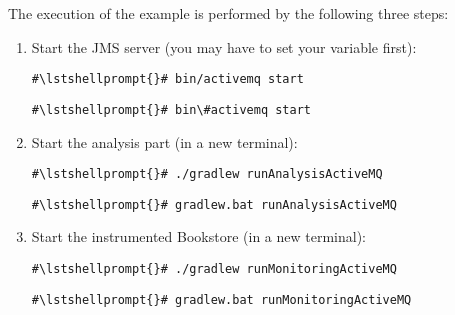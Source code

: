  The execution of the example is performed by the following three steps:
\begin{enumerate}
\item Start the JMS server (you may have to set your  variable first):

\setBashListing
\begin{lstlisting}[caption=Start of the JMS server under UNIX-like systems]
#\lstshellprompt{}# bin/activemq start
\end{lstlisting}
\begin{lstlisting}[caption=Start of the JMS server under Windows]
#\lstshellprompt{}# bin\#activemq start
\end{lstlisting}
\item Start the analysis part (in a new terminal):
\setBashListing
\begin{lstlisting}[caption=Start the analysis part under UNIX-like systems]
#\lstshellprompt{}# ./gradlew runAnalysisActiveMQ
\end{lstlisting}
\begin{lstlisting}[caption=Start the analysis part under Windows]
#\lstshellprompt{}# gradlew.bat runAnalysisActiveMQ
\end{lstlisting}
\item Start the instrumented Bookstore (in a new terminal):
\setBashListing
\begin{lstlisting}[caption=Start the analysis part under UNIX-like systems]
#\lstshellprompt{}# ./gradlew runMonitoringActiveMQ
\end{lstlisting}
\begin{lstlisting}[caption=Start the analysis part under Windows]
#\lstshellprompt{}# gradlew.bat runMonitoringActiveMQ
\end{lstlisting}
\end{enumerate}
